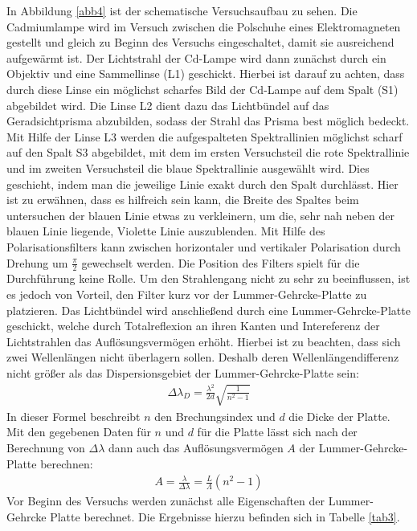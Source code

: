 In Abbildung \ref{abb4} ist der schematische Versuchsaufbau zu sehen. Die Cadmiumlampe
wird im Versuch zwischen die Polschuhe eines Elektromagneten gestellt und gleich zu
Beginn des Versuchs eingeschaltet, damit sie ausreichend aufgewärmt ist.
Der Lichtstrahl der Cd-Lampe wird dann zunächst durch ein Objektiv und eine Sammellinse (L1)
geschickt. Hierbei ist darauf zu achten, dass durch diese Linse ein möglichst scharfes
Bild der Cd-Lampe auf dem Spalt (S1) abgebildet wird. Die Linse L2 dient dazu das Lichtbündel
auf das Geradsichtprisma abzubilden, sodass der Strahl das Prisma best möglich bedeckt.
Mit Hilfe der Linse L3 werden die aufgespalteten Spektrallinien möglichst scharf auf den
Spalt S3 abgebildet, mit dem im ersten Versuchsteil die rote Spektrallinie und im zweiten
Versuchsteil die blaue Spektrallinie ausgewählt wird. Dies geschieht, indem man die jeweilige
Linie exakt durch den Spalt durchlässt. Hier ist zu erwähnen, dass es hilfreich sein kann, die
Breite des Spaltes beim untersuchen der blauen Linie etwas zu verkleinern, um die, sehr nah neben
der blauen Linie liegende, Violette Linie auszublenden.
Mit Hilfe des Polarisationsfilters kann zwischen horizontaler und vertikaler Polarisation durch
Drehung um $\frac{\pi}{2}$ gewechselt werden.
Die Position des Filters spielt für die Durchführung
keine Rolle. Um den Strahlengang nicht zu sehr zu beeinflussen, ist es jedoch von Vorteil, den Filter
kurz vor der Lummer-Gehrcke-Platte zu platzieren.
Das Lichtbündel wird anschließend durch eine Lummer-Gehrcke-Platte geschickt, welche durch
Totalreflexion an ihren Kanten und Intereferenz der Lichtstrahlen das Auflösungsvermögen erhöht.
Hierbei ist zu beachten, dass sich zwei Wellenlängen nicht überlagern sollen. Deshalb deren
Wellenlängendifferenz nicht größer als das Dispersionsgebiet der Lummer-Gehrcke-Platte sein:
\begin{align*}
    \Delta \lambda_D =\frac{\lambda^2}{2d}\sqrt{\frac{1}{n^2-1}}
    \label{eq:dis}
\end{align*}
In dieser Formel beschreibt $n$ den Brechungsindex und $d$ die Dicke der Platte.
Mit den gegebenen Daten für $n$ und $d$ für die Platte lässt sich nach der Berechnung von
$\Delta \lambda$ dann auch das Auflösungsvermögen $A$ der Lummer-Gehrcke-Platte berechnen:
\begin{align*}
    A = \frac{\lambda}{\Delta\lambda}=\frac{L}{\Lambda}(n^2-1)
\end{align*}
Vor Beginn des Versuchs werden zunächst alle Eigenschaften der Lummer-Gehrcke Platte berechnet.
Die Ergebnisse hierzu befinden sich in Tabelle \ref{tab3}.

